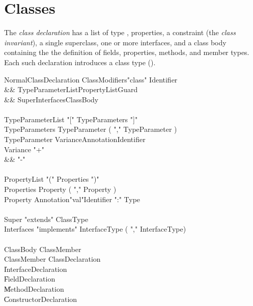 \chapter{Classes}
\label{XtenClasses}

The {\em class declaration} has a list of type \params, properties, a
constraint (the {\em class invariant}), a single superclass, one or
more interfaces, and a class body containing the the definition of
fields, properties, methods, and member types.  Each such declaration introduces a
class type ().


\begin{grammar}
NormalClassDeclaration \:
      ClassModifiers\opt \xcd"class" Identifier  \\
   && TypeParameterList\opt PropertyList\opt Guard\opt \\
   && Super\opt Interfaces\opt ClassBody \\
\\
TypeParameterList     \:  \xcd"[" TypeParameters \xcd"]" \\
TypeParameters        \:  TypeParameter ( \xcd"," TypeParameter )\star \\
TypeParameter         \:  Variance\opt Annotation\star Identifier     \\
Variance \: \xcd"+" \\
         && \xcd"-" \\
\\
PropertyList     \:  \xcd"(" Properties \xcd")" \\
Properties       \:  Property ( \xcd"," Property )\star \\
Property         \:  Annotation\star \xcd"val"\opt Identifier \xcd":" Type \\
\\
Super \: \xcd"extends" ClassType \\
Interfaces \: \xcd"implements" InterfaceType ( \xcd"," InterfaceType)\star \\
\\
ClassBody \: ClassMember\star \\
ClassMember \: ClassDeclaration \\
            \| InterfaceDeclaration \\
            \| FieldDeclaration \\
            \| MethodDeclaration \\
            \| ConstructorDeclaration \\
\end{grammar}

